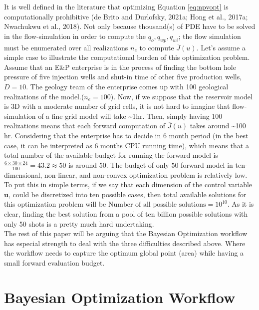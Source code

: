 \documentclass[]{elsarticle} %
\begin{document}
It is well defined in the literature that optimizing Equation \eqref{eq:npvopt} is computationally prohibitive (de Brito and Durlofsky, 2021a; Hong et al., 2017a; Nwachukwu et al., 2018). Not only because thousand(s) of PDE have to be solved in the flow-simulation in order to compute the \(q_o, q_{wp}, q_{wi}\); the flow simulation must be enumerated over all realizations \(n_e\) to compute \(\overline{J}(u)\). Let's assume a simple case to illustrate the computational burden of this optimization problem. Assume that an E\&P enterprise is in the process of finding the bottom hole pressure of five injection wells and shut-in time of other five production wells, \(D=10\). The geology team of the enterprise comes up with 100 geological realizations of the model.(\(n_e=100\)). Now, if we suppose that the reservoir model is 3D with a moderate number of grid cells, it is not hard to imagine that flow-simulation of a fine grid model will take \textasciitilde1hr. Then, simply having 100 realizations means that each forward computation of \(\overline{J}(u)\) takes around \textasciitilde100 hr. Considering that the enterprise has to decide in 6 month period (in the best case, it can be interpreted as 6 months CPU running time), which means that a total number of the available budget for running the forward model is\(\frac{6 \times 30 \times 24 }{100}= 43.2 \approx 50\) is around 50. The budget of only \(50\) forward model in ten-dimensional, non-linear, and non-convex optimization problem is relatively low. To put this in simple terms, if we say that each dimension of the control variable \(\mathbf{u}\), could be discretized into ten possible cases, then total available solutions for this optimization problem will be \(\text {Number of all possible solutions} = 10^{10}\). As it is clear, finding the best solution from a pool of ten billion possible solutions with only 50 shots is a pretty much hard undertaking.\\

The rest of this paper will be arguing that the Bayesian Optimization workflow has especial strength to deal with the three difficulties described above. Where the workflow needs to capture the optimum global point (area) while having a small forward evaluation budget.

\newpage

\hypertarget{bayesian-optimization-workflow}{%
\section{Bayesian Optimization Workflow}\label{bayesian-optimization-workflow}}
\end{document}
